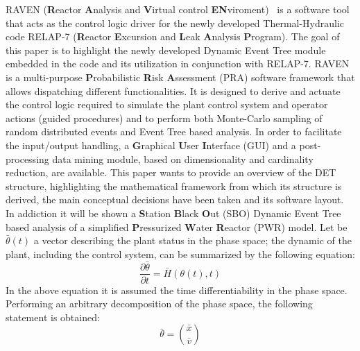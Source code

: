 \documentclass{mc2013}
\begin{document}
\setlength{\baselineskip}{14pt}
\normalsize

RAVEN (\textbf{R}eactor \textbf{A}nalysis and \textbf{V}irtual control \textbf{EN}viroment)~\cite{ravenFY12,mandelliANS2012} is a software tool that acts as the control logic driver for the newly developed Thermal-Hydraulic code RELAP-7  (\textbf{R}eactor \textbf{E}xcursion and \textbf{L}eak \textbf{A}nalysis \textbf{P}rogram). The goal of this paper is to highlight the newly developed  Dynamic Event Tree module embedded in the code and its utilization in conjunction with RELAP-7. RAVEN is a multi-purpose \textbf{P}robabilistic \textbf{R}isk \textbf{A}ssessment (PRA) software framework that allows dispatching different functionalities. 
It is designed to derive and actuate the control logic required to simulate the plant control system and operator actions (guided procedures) and to perform both Monte-Carlo sampling of random distributed events and Event Tree based analysis. 
In order to facilitate the input/output handling, a \textbf{G}raphical \textbf{U}ser \textbf{I}nterface (GUI) and a post-processing data mining module, based on dimensionality and cardinality reduction, are available.
This paper wants to provide an overview of the DET structure, highlighting the mathematical framework from which its structure is derived, the main conceptual decisions have been taken and its software layout. In addiction it will be shown a \textbf{S}tation \textbf{B}lack \textbf{O}ut (SBO) Dynamic Event Tree based analysis of a simplified \textbf{P}ressurized \textbf{W}ater \textbf{R}eactor (PWR) model.
\vspace{-5mm}
\label{sec:mathFramework}
Let be $\bar{\theta}(t)$ a vector describing the plant status in the phase space; the dynamic of the plant, including the control system, can be summarized by the following equation:
\begin{equation}
\frac{\partial \bar{\theta}}{\partial t} = \bar{H}(\theta(t),t)
\label{eq:SystemDynamics}
\end{equation}
In the above equation it is assumed the time differentiability in the phase space. Performing an arbitrary decomposition of the phase space, the following statement is obtained:
\begin{equation}
\bar{\theta}=\binom{\bar{x}}{\bar{v}}
\label{eq:firstDecomposition}
\end{equation}
\end{document}
